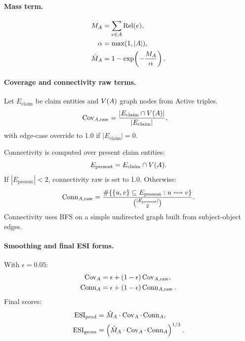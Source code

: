 \paragraph{Mass term.}
\begin{align}
M_{A} &= \sum_{e\in A} \operatorname{Rel}(e), \\
\alpha &= \max(1, |A|), \\
\hat{M}_{A} &= 1-\exp\!\left(-\frac{M_{A}}{\alpha}\right).
\end{align}

\paragraph{Coverage and connectivity raw terms.}
Let $E_{\text{claim}}$ be claim entities and $V(A)$ graph nodes from Active triples.
\begin{align}
\operatorname{Cov}_{A,\text{raw}} &= \frac{|E_{\text{claim}}\cap V(A)|}{|E_{\text{claim}}|},
\end{align}
with edge-case override to 1.0 if $|E_{\text{claim}}|=0$.

Connectivity is computed over present claim entities:
\begin{equation}
E_{\text{present}} = E_{\text{claim}}\cap V(A).
\end{equation}
If $|E_{\text{present}}|<2$, connectivity raw is set to 1.0.
Otherwise:
\begin{equation}
\operatorname{Conn}_{A,\text{raw}} = \frac{\#\{\{u,v\}\subseteq E_{\text{present}}: u\leftrightsquigarrow v\}}{\binom{|E_{\text{present}}|}{2}}.
\end{equation}
Connectivity uses BFS on a simple undirected graph built from subject-object edges.

\paragraph{Smoothing and final ESI forms.}
With $\epsilon=0.05$:
\begin{align}
\operatorname{Cov}_{A} &= \epsilon + (1-\epsilon)\operatorname{Cov}_{A,\text{raw}}, \\
\operatorname{Conn}_{A} &= \epsilon + (1-\epsilon)\operatorname{Conn}_{A,\text{raw}}.
\end{align}
Final scores:
\begin{align}
\operatorname{ESI}_{\mathrm{prod}} &= \hat{M}_{A}\cdot\operatorname{Cov}_{A}\cdot\operatorname{Conn}_{A}, \\
\operatorname{ESI}_{\mathrm{geom}} &= \left(\hat{M}_{A}\cdot\operatorname{Cov}_{A}\cdot\operatorname{Conn}_{A}\right)^{1/3}.
\end{align}

